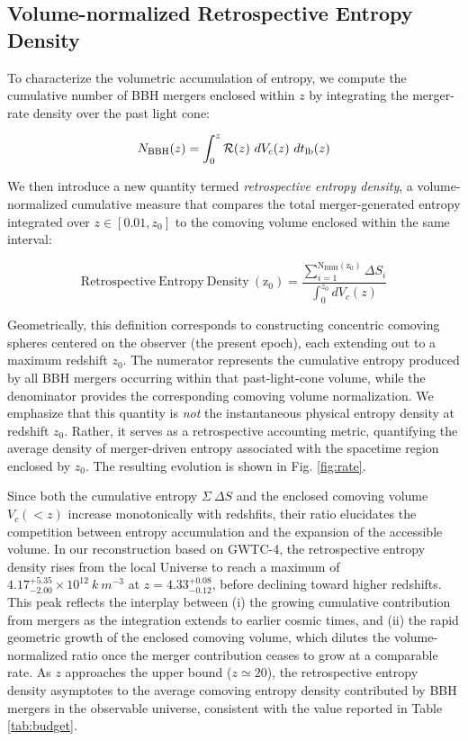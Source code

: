 \documentclass[twocolumn]{aastex631}
\begin{document}
\subsection{Volume-normalized Retrospective Entropy Density}

To characterize the volumetric accumulation of entropy, we compute the cumulative number of BBH mergers enclosed within $z$ by integrating the merger-rate density over the past light cone:

\begin{equation}
    \centering
    N_\mathrm{BBH}(z) = \int_{0}^{z} \mathcal{R}(z)~dV_c(z)~dt_\mathrm{lb}(z)
    \label{eq:cumulative}
\end{equation}

We then introduce a new quantity termed \textit{retrospective entropy density}, a volume-normalized cumulative measure that compares the total merger-generated entropy integrated over $z \in [0.01, z_0]$ to the comoving volume enclosed within the same interval:

\begin{equation}
    \mathrm{Retrospective~Entropy~Density~(z_0)} = \frac{\sum^{\mathrm{N_{BBH}(z_0)}}_{i=1} \Delta S_i}{\int^{z_0}_0 dV_{c}(z)}
    \label{eq:rate_entropy_density}
\end{equation}

Geometrically, this definition corresponds to constructing concentric comoving spheres centered on the observer (the present epoch), each extending out to a maximum redshift $z_0$. The numerator represents the cumulative entropy produced by all BBH mergers occurring within that past-light-cone volume, while the denominator provides the corresponding comoving volume normalization. We emphasize that this quantity is \emph{not} the instantaneous physical entropy density at redshift $z_0$. Rather, it serves as a retrospective accounting metric, quantifying the average density of merger-driven entropy associated with the spacetime region enclosed by $z_0$. The resulting evolution is shown in Fig. \ref{fig:rate}.

Since both the cumulative entropy $\Sigma~\Delta S$ and the enclosed comoving volume $V_c(<z)$ increase monotonically with redshfits, their ratio elucidates the competition between entropy accumulation and the expansion of the accessible volume. In our reconstruction based on GWTC-4, the retrospective entropy density rises from the local Universe to reach a maximum of $4.17^{+5.35}_{-2.00} \times 10^{12}~k~m^{-3}$ at $z = 4.33^{+0.08}_{-0.12}$, before declining toward higher redshifts. This peak reflects the interplay between (i) the growing cumulative contribution from mergers as the integration extends to earlier cosmic times, and (ii) the rapid geometric growth of the enclosed comoving volume, which dilutes the volume-normalized ratio once the merger contribution ceases to grow at a comparable rate. As $z$ approaches the upper bound ($z \simeq 20$), the retrospective entropy density asymptotes to the average comoving entropy density contributed by BBH mergers in the observable universe, consistent with the value reported in Table \ref{tab:budget}.
\end{document}
